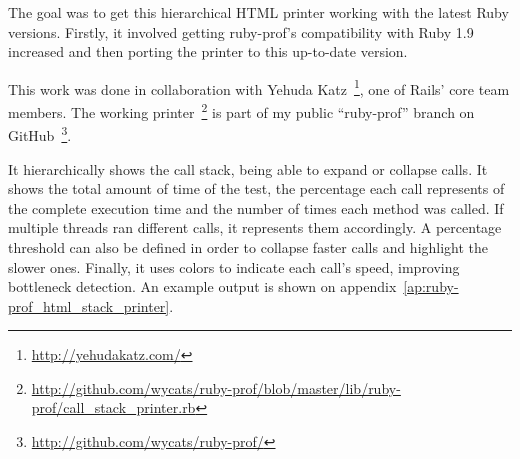 The goal was to get this hierarchical HTML printer working with the latest Ruby versions. Firstly, it involved getting ruby-prof's compatibility with Ruby 1.9 increased and then porting the printer to this up-to-date version.

This work was done in collaboration with Yehuda Katz~\footnote{\url{http://yehudakatz.com/}}, one of Rails' core team members. The working printer~\footnote{\url{http://github.com/wycats/ruby-prof/blob/master/lib/ruby-prof/call_stack_printer.rb}} is part of my public ``ruby-prof'' branch on GitHub~\footnote{\url{http://github.com/wycats/ruby-prof/}}.

It hierarchically shows the call stack, being able to expand or collapse calls. It shows the total amount of time of the test, the percentage each call represents of the complete execution time and the number of times each method was called. If multiple threads ran different calls, it represents them accordingly. A percentage threshold can also be defined in order to collapse faster calls and highlight the slower ones. Finally, it uses colors to indicate each call's speed, improving bottleneck detection. An example output is shown on appendix~\ref{ap:ruby-prof_html_stack_printer}.
